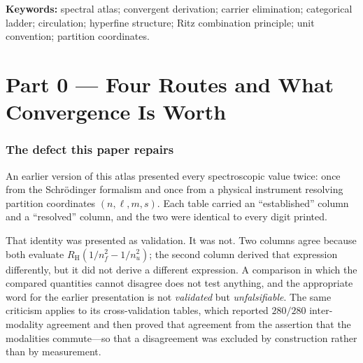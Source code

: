 \documentclass[11pt,a4paper]{article}
\theoremstyle{stmtstyle}
\theoremstyle{definition}
\theoremstyle{remark}
\begin{document}
\begin{abstract}
The hyperfine 21\,cm line is the sharpest case the ladder reading
addresses. It rewrites the parity letter $s$ alone, with $n$, $\ell$ and
$m$ fixed. Chirality is a topological invariant, so a rung on $s$ alone is
electric-dipole forbidden; measured against the atlas its power is
$4.32\times10^{-7}$, five point eight five orders of magnitude below the
smallest allowed rung and distinguishable from the exactly-zero power of a
truly inert rung. Near-inert, not inert, is the ladder statement of a
$10^{7}$-year lifetime.

We close by stating what is not established: the ladder route reconstructs
rather than predicts transition energies, one registered expectation was
refuted before being diagnosed, and no route here computes a spectrum that
was not already measured.
\end{abstract}

\noindent\textbf{Keywords:} spectral atlas; convergent derivation; carrier
elimination; categorical ladder; circulation; hyperfine structure; Ritz
combination principle; unit convention; partition coordinates.

\vspace{6pt}
\tableofcontents
\vspace{6pt}

\clearpage

\part*{Part 0 --- Four Routes and What Convergence Is Worth}

\section{The defect this paper repairs}
\label{sec:goal}

An earlier version of this atlas presented every spectroscopic value twice:
once from the Schr\"odinger formalism and once from a physical instrument
resolving partition coordinates $(n,\ell,m,s)$. Each table carried an
``established'' column and a ``resolved'' column, and the two were
identical to every digit printed.

That identity was presented as validation. It was not. Two columns agree
because both evaluate $R_{\mathrm H}(1/n_f^{2}-1/n_u^{2})$; the second
column derived that expression differently, but it did not derive a
different expression. A comparison in which the compared quantities cannot
disagree does not test anything, and the appropriate word for the earlier
presentation is not \emph{validated} but \emph{unfalsifiable}. The same
criticism applies to its cross-validation tables, which reported $280/280$
inter-modality agreement and then proved that agreement from the assertion
that the modalities commute---so that a disagreement was excluded by
construction rather than by measurement.
\end{document}
